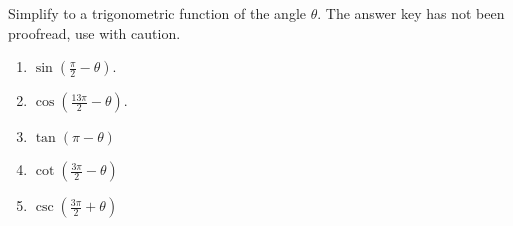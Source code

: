 Simplify to a trigonometric function of the angle $\theta$. The answer key has not been proofread, use with caution.


\begin{enumerate}[ref={\fcProblemRef}]
\item $\sin \left(\frac{\pi}{2}-\theta\right)$.

\answer{$\cos \theta$}
\item $\cos \left(\frac{13\pi}{2}-\theta\right)$.

\answer{$\sin\theta$}
\item $\tan \left(\pi - \theta\right)$

\answer{$-\tan \theta$}
\item $\cot \left(\frac{3\pi}{2} - \theta\right)$

\answer{$\tan \theta $}

\item $\csc \left(\frac{3\pi}{2} + \theta\right)$

\answer{$\sec \theta $}

\end{enumerate}

